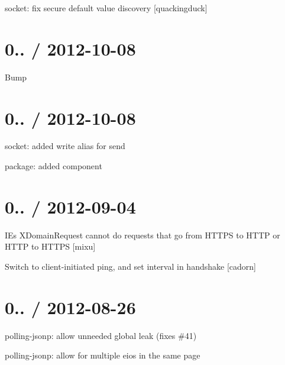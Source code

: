 \begin{DoxyItemize}
\item socket\+: fix {\ttfamily secure} default value discovery \mbox{[}quackingduck\mbox{]}
\end{DoxyItemize}

\section*{0.. / 2012-\/10-\/08 }


\begin{DoxyItemize}
\item Bump
\end{DoxyItemize}

\section*{0.. / 2012-\/10-\/08 }


\begin{DoxyItemize}
\item socket\+: added {\ttfamily write} alias for {\ttfamily send}
\item package\+: added {\ttfamily component}
\end{DoxyItemize}

\section*{0.. / 2012-\/09-\/04 }


\begin{DoxyItemize}
\item IE\textquotesingle{}s X\+Domain\+Request cannot do requests that go from H\+T\+T\+PS to H\+T\+TP or H\+T\+TP to H\+T\+T\+PS \mbox{[}mixu\mbox{]}
\item Switch to client-\/initiated ping, and set interval in handshake \mbox{[}cadorn\mbox{]}
\end{DoxyItemize}

\section*{0.. / 2012-\/08-\/26 }


\begin{DoxyItemize}
\item polling-\/jsonp\+: allow unneeded global leak (fixes \#41)
\item polling-\/jsonp\+: allow for multiple eio\textquotesingle{}s in the same page
\end{DoxyItemize}

